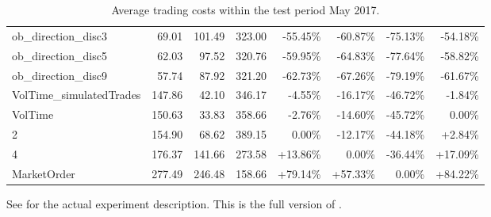 \begin{table}[ht]
{\begin{tabular}{lRRR|RRRR}
\midrule
ob\_direction\_disc3             &     69.01 &  101.49 &  323.00 &  -55.45\% &  -60.87\% &  -75.13\% &      -54.18\% \\
ob\_direction\_disc5             &     62.03 &   97.52 &  320.76 &  -59.95\% &  -64.83\% &  -77.64\% &      -58.82\% \\
ob\_direction\_disc9             &     57.74 &   87.92 &  321.20 &  -62.73\% &  -67.26\% &  -79.19\% &      -61.67\% \\
\midrule
VolTime\_simulatedTrades &    147.86 &   42.10 &  346.17 &   -4.55\% &  -16.17\% &  -46.72\% &       -1.84\% \\
VolTime                        &    150.63 &   33.83 &  358.66 &   -2.76\% &  -14.60\% &  -45.72\% &        0.00\% \\
2                              &    154.90 &   68.62 &  389.15 &    0.00\% &  -12.17\% &  -44.18\% &        +2.84\% \\
4                              &    176.37 &  141.66 &  273.58 &   +13.86\% &    0.00\% &  -36.44\% &       +17.09\% \\
MarketOrder                    &    277.49 &  246.48 &  158.66 &   +79.14\% &   +57.33\% &    0.00\% &      +84.22\% \\
\bottomrule
\end{tabular}}

        		\caption[Full version of ]{Average trading costs within the test period May 2017.}
		See  for the actual experiment description. This is the full version of .
		\label{tab:eval:additionalMarketVariables:simulatedTrades:fulltable}
\end{table}